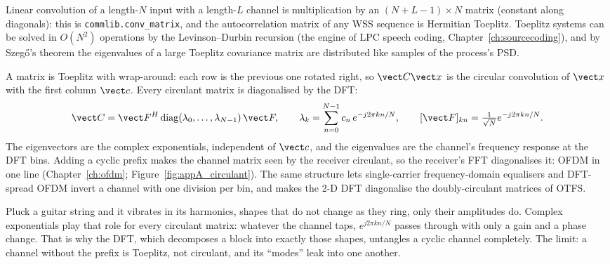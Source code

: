 Linear convolution of a length-$N$ input with a length-$L$ channel is multiplication by an
$(N+L-1)\times N$  matrix (constant along diagonals): this is
\texttt{commlib.conv\_matrix}, and the autocorrelation matrix of any WSS sequence is Hermitian
Toeplitz. Toeplitz systems can be solved in $O(N^2)$ operations by the Levinson--Durbin recursion
(the engine of LPC speech coding, Chapter~\ref{ch:sourcecoding}), and by Szeg\H{o}'s theorem the
eigenvalues of a large Toeplitz covariance matrix are distributed like samples of the process's
PSD.

A  matrix is Toeplitz with wrap-around: each row is the previous one rotated right,
so $\vect C\vect x$ is the circular convolution of $\vect x$ with the first column $\vect c$. Every
circulant matrix is diagonalised by the DFT:
\begin{equation}
\vect C=\vect F^H\operatorname{diag}(\lambda_0,\dots,\lambda_{N-1})\,\vect F,\qquad
\lambda_k=\sum_{n=0}^{N-1}c_n\,e^{-j2\pi kn/N},\qquad [\vect F]_{kn}=\tfrac1{\sqrt N}e^{-j2\pi kn/N}.
\label{eq:appA:circulant}
\end{equation}
The eigenvectors are the complex exponentials, independent of $\vect c$, and the eigenvalues are the
channel's frequency response at the DFT bins. Adding a cyclic prefix makes the channel matrix seen
by the receiver circulant, so the receiver's FFT diagonalises it: OFDM in one line
(Chapter~\ref{ch:ofdm}; Figure~\ref{fig:appA_circulant}). The same structure lets single-carrier
frequency-domain equalisers and DFT-spread OFDM invert a channel with one division per bin, and
makes the 2-D DFT diagonalise the doubly-circulant matrices of OTFS.


\begin{analogy}
Pluck a guitar string and it vibrates in its harmonics, shapes that do not change as they ring, only
their amplitudes do. Complex exponentials play that role for every circulant matrix: whatever the
channel taps, $e^{j2\pi kn/N}$ passes through with only a gain and a phase change. That is why the
DFT, which decomposes a block into exactly those shapes, untangles a cyclic channel completely.
The limit: a channel without the prefix is Toeplitz, not circulant, and its ``modes'' leak into
one another.
\end{analogy}


